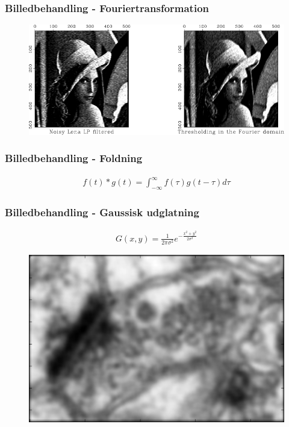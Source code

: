 \documentclass[12pt,t]{beamer}
\begin{document}
\begin{frame}
\frametitle{Billedbehandling - Fouriertransformation}
\begin{figure}[H]
\includegraphics[scale=0.29]{img/billedbeh/lenaex1.png}
\end{figure}
\end{frame}

\begin{frame}
\frametitle{Billedbehandling - Foldning}
\begin{align*}
	f(t)*g(t)=\int_{-\infty}^{\infty}f(\tau)g(t-\tau)d\tau
\end{align*}

\end{frame}

\begin{frame}
\frametitle{Billedbehandling - Gaussisk udglatning}
\begin{align*}
	G(x,y) = \frac{1}{2\pi\sigma^2}e^{-\frac{x^2+y^2}{2\sigma^2}}\label{ali:premethod_gaussG}
\end{align*}

\begin{figure}[H]
	\centering
	\includegraphics[scale=0.5]{../files/premethod/img/gausscell.png}
\end{figure}
\end{frame}
\end{document}
